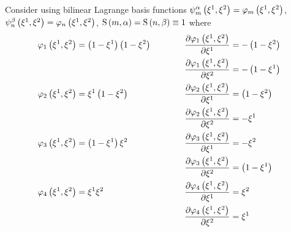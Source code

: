 Consider using bilinear Lagrange basis functions \ie
$\gbfn{m}{\alpha}{\xione,\xitwo}=\lbfn{m}{\xione,\xitwo}$,
$\gbfn{n}{\beta}{\xione,\xitwo}=\lbfn{n}{\xione,\xitwo}$,
$\gsf{m}{\alpha}=\gsf{n}{\beta}\equiv 1$ where
\begin{alignat*}{3}
  \lbfn{1}{\xione,\xitwo}&=\pbrac{1-\xione}\pbrac{1-\xitwo}&\quad&&\delby{\lbfn{1}{\xione,\xitwo}}{\xione}&=-\pbrac{1-\xitwo}\\
  &&&&\delby{\lbfn{1}{\xione,\xitwo}}{\xitwo}&=-\pbrac{1-\xione} \\
  \lbfn{2}{\xione,\xitwo}&=\xione\pbrac{1-\xitwo}&\qquad&&\delby{\lbfn{2}{\xione,\xitwo}}{\xione}&=\pbrac{1-\xitwo}\\
  &&&&\delby{\lbfn{2}{\xione,\xitwo}}{\xitwo}&=-\xione\\
  \lbfn{3}{\xione,\xitwo}&=\pbrac{1-\xione}\xitwo&\qquad&&\delby{\lbfn{3}{\xione,\xitwo}}{\xione}&=-\xitwo\\
  &&&&\delby{\lbfn{3}{\xione,\xitwo}}{\xitwo}&=\pbrac{1-\xione}\\
  \lbfn{4}{\xione,\xitwo}&=\xione\xitwo&\qquad&&\delby{\lbfn{4}{\xione,\xitwo}}{\xione}&=\xitwo\\
  &&&&\delby{\lbfn{4}{\xione,\xitwo}}{\xitwo}&=\xione
\end{alignat*}

